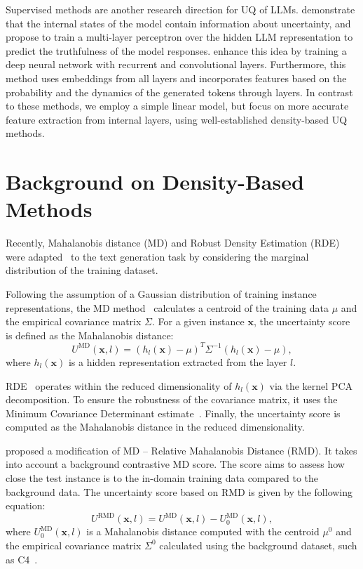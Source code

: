\documentclass[11pt]{article}
\newcommand{\xv}{\mathbf{x}}
\begin{document}
  Supervised methods are another research direction for UQ of LLMs. \citet{azaria-mitchell-2023-internal} demonstrate that the internal states of the model contain information about uncertainty, and propose to train a multi-layer perceptron over the hidden LLM representation to predict the truthfulness of the model responses. \citet{he-etal-2024-llm} enhance this idea by training a deep neural network with recurrent and convolutional layers. Furthermore, this method uses embeddings from all layers and incorporates features based on the probability and the dynamics of the generated tokens through layers. In contrast to these methods, we employ a simple linear model, but focus on more accurate feature extraction from internal layers, using well-established density-based UQ methods.

\section{Background on Density-Based Methods}
  Recently, Mahalanobis distance (MD) and Robust Density Estimation (RDE) were adapted~\cite{vazhentsev-etal-2023-efficient,ren2023outofdistribution} to the text generation task by considering the marginal distribution of the training dataset. 

  Following the assumption of a Gaussian distribution of training instance representations, the MD method~\cite{lee2018simple} calculates a centroid of the training data $\mu$ and the empirical covariance matrix $\Sigma$. For a given instance $\xv$, the uncertainty score is defined as the Mahalanobis distance:
  \begin{equation*}
    U^{\text{MD}}(\xv, l) = (h_l(\xv) - \mu)^{T} \Sigma^{-1} (h_l(\xv) - \mu),
  \end{equation*}
  where $h_l(\xv)$ is a hidden representation extracted from the layer $l$.

  RDE~\cite{yoo-etal-2022-detection} operates within the reduced dimensionality of $h_l(\xv)$ via the kernel PCA decomposition. To ensure the robustness of the covariance matrix, it uses the Minimum Covariance Determinant estimate~\cite{Rousseeuw84leastmedian}. Finally, the uncertainty score is computed as the Mahalanobis distance in the reduced dimensionality.

  \citet{ren2023outofdistribution} proposed a modification of MD -- Relative Mahalanobis Distance (RMD). It takes into account a background contrastive MD score. The score aims to assess how close the test instance is to the in-domain training data compared to the background data. The uncertainty score based on RMD is given by the following equation:
  \begin{equation*}
    U^{\text{RMD}}(\xv, l) = U^{\text{MD}}(\xv, l) - U^{\text{MD}}_0(\xv, l),
  \end{equation*}
  where $U^{\text{MD}}_0(\xv, l)$ is a Mahalanobis distance computed with the centroid $\mu^0$ and the empirical covariance matrix $\Sigma^0$ calculated using the background dataset, such as C4~\cite{c4dataset}.
\end{document}
